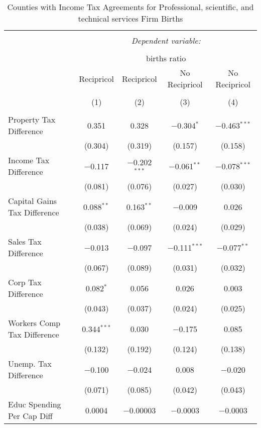 
\begin{table}[!htbp] \centering 
  \caption{Counties with Income Tax Agreements for  Professional, scientific, and technical services Firm Births} 
  \label{54rd} 
\begin{tabular}{@{\extracolsep{5pt}}lcccc} 
\\[-1.8ex]\hline 
\hline \\[-1.8ex] 
 & \multicolumn{4}{c}{\textit{Dependent variable:}} \\ 
\cline{2-5} 
\\[-1.8ex] & \multicolumn{4}{c}{births ratio} \\ 
 & Recipricol & Recipricol & No Recipricol & No Recipricol \\ 
\\[-1.8ex] & (1) & (2) & (3) & (4)\\ 
\hline \\[-1.8ex] 
 Property Tax Difference & 0.351 & 0.328 & $-$0.304$^{*}$ & $-$0.463$^{***}$ \\ 
  & (0.304) & (0.319) & (0.157) & (0.158) \\ 
  Income Tax Difference & $-$0.117 & $-$0.202$^{***}$ & $-$0.061$^{**}$ & $-$0.078$^{***}$ \\ 
  & (0.081) & (0.076) & (0.027) & (0.030) \\ 
  Capital Gains Tax Difference & 0.088$^{**}$ & 0.163$^{**}$ & $-$0.009 & 0.026 \\ 
  & (0.038) & (0.069) & (0.024) & (0.029) \\ 
  Sales Tax Difference & $-$0.013 & $-$0.097 & $-$0.111$^{***}$ & $-$0.077$^{**}$ \\ 
  & (0.067) & (0.089) & (0.031) & (0.032) \\ 
  Corp Tax Difference & 0.082$^{*}$ & 0.056 & 0.026 & 0.003 \\ 
  & (0.043) & (0.037) & (0.024) & (0.025) \\ 
  Workers Comp Tax Difference & 0.344$^{***}$ & 0.030 & $-$0.175 & 0.085 \\ 
  & (0.132) & (0.192) & (0.124) & (0.138) \\ 
  Unemp. Tax Difference & $-$0.100 & $-$0.024 & 0.008 & $-$0.020 \\ 
  & (0.071) & (0.085) & (0.042) & (0.043) \\ 
  Educ Spending Per Cap Diff & 0.0004 & $-$0.00003 & $-$0.0003 & $-$0.0003 \\ 

\end{tabular}
\end{table}
